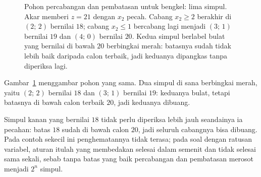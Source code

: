 \begin{figure}[!ht]
\centering
{}
\caption{Pohon percabangan dan pembatasan untuk bengkel: lima simpul. Akar memberi $z=21$
dengan $x_{2}$ pecah. Cabang $x_{2}\ge2$ berakhir di $(2;\,2)$ bernilai $18$; cabang
$x_{2}\le1$ bercabang lagi menjadi $(3;\,1)$ bernilai $19$ dan $(4;\,0)$ bernilai $20$.
Kedua simpul berlabel bulat yang bernilai di bawah $20$ berbingkai merah: batasnya sudah
tidak lebih baik daripada calon terbaik, jadi keduanya dipangkas tanpa diperiksa lagi.}
\label{fig:ch22-pohon-percabangan}
\end{figure}

Gambar~\ref{fig:ch22-pohon-percabangan} menggambar pohon yang sama. Dua simpul di sana
berbingkai merah, yaitu $(2;\,2)$ bernilai $18$ dan $(3;\,1)$ bernilai $19$: keduanya bulat,
tetapi batasnya di bawah calon terbaik $20$, jadi keduanya dibuang.

Simpul kanan yang bernilai $18$ tidak perlu diperiksa lebih jauh seandainya
ia pecahan: batas $18$ sudah di bawah calon $20$, jadi seluruh cabangnya bisa dibuang. Pada
contoh sekecil ini penghematannya tidak terasa; pada soal dengan ratusan variabel, aturan
itulah yang membedakan selesai dalam semenit dan tidak selesai sama sekali, sebab tanpa
batas yang baik percabangan dan pembatasan merosot menjadi $2^{n}$ simpul.

